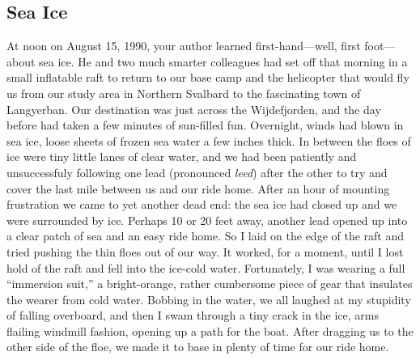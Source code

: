 \subsection{Sea Ice}
At noon on August 15, 1990, your author learned first-hand---well, first foot---about sea ice. He and two much smarter colleagues had set off that morning in a small inflatable raft to return to our base camp and the helicopter that would fly us from our study area in Northern Svalbard to the fascinating town of Langyerban. Our destination was just across the Wijdefjorden, and the day before had taken a few minutes of sun-filled fun. Overnight, winds had blown in sea ice, loose sheets of frozen sea water a few inches thick. In between the floes of ice were tiny little lanes of clear water, and we had been patiently and unsuccessfuly following one lead (pronounced \textit{leed}) after the other to try and cover the last mile between us and our ride home. After an hour of mounting frustration we came to yet another dead end: the sea ice had closed up and we were surrounded by ice. Perhaps 10 or 20 feet away, another lead opened up into a clear patch of sea and an easy ride home. So I laid on the edge of the raft and tried pushing the thin floes out of our way. It worked, for a moment, until I lost hold of the raft and fell into the ice-cold water. Fortunately, I was wearing a full ``immersion suit,'' a bright-orange, rather cumbersome piece of gear that insulates the wearer from cold water. Bobbing in the water, we all laughed at my stupidity of falling overboard, and then I swam through a tiny crack in the ice, arms flailing windmill fashion, opening up a path for the boat. After dragging us to the other side of the floe, we made it to base in plenty of time for our ride home. \\

